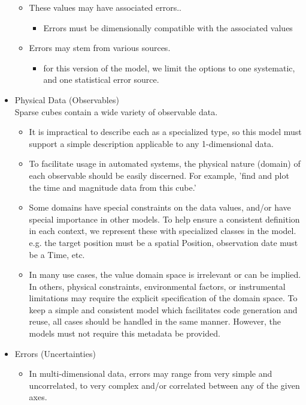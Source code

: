 \documentclass[11pt,a4paper]{ivoa}
\begin{document}
\begin{itemize}
\begin{itemize}
      \item These values may have associated errors..
        \begin{itemize}
           \item Errors must be dimensionally compatible with the associated values
        \end{itemize}
      \item Errors may stem from various sources.
      \begin{itemize}
         \item for this version of the model, we limit the options to one systematic, and one statistical error source.
      \end{itemize}
    \end{itemize}
    \item Physical Data (Observables) \\
       Sparse cubes contain a wide variety of observable data.
    \begin{itemize}
       \item It is impractical to describe each as a specialized type, so this model must support a simple description applicable to any 1-dimensional data.
       \item To facilitate usage in automated systems, the physical nature (domain) of each observable should be easily discerned.
         For example, 'find and plot the time and magnitude data from this cube.'
       \item Some domains have special constraints on the data values, and/or have special importance in other models.
         To help ensure a consistent definition in each context, we represent these with specialized classes in the model. \\
         e.g. the target position must be a spatial Position, observation date must be a Time, etc.
       \item In many use cases, the value domain space is irrelevant or can be implied.  In others, physical constraints, environmental factors,
         or instrumental limitations may require the explicit specification of the domain space.  To keep a simple and consistent model
         which facilitates code generation and reuse, all cases should be handled in the same manner.  However, the models must not require this metadata be provided.
    \end{itemize}
    \item Errors (Uncertainties)
    \begin{itemize}
      \item In multi-dimensional data, errors may range from very simple and uncorrelated, to very complex and/or correlated between any of the given axes.

\end{itemize}
\end{itemize}
\end{document}
